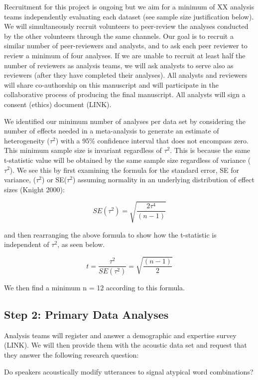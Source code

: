 \documentclass[
  english,
  man]{apa6}
\begin{document}
Recruitment for this project is ongoing but we aim for a minimum of XX analysis teams independently evaluating each dataset (see sample size justification below).
We will simultaneously recruit volunteers to peer-review the analyses conducted by the other volunteers through the same channels.
Our goal is to recruit a similar number of peer-reviewers and analysts, and to ask each peer reviewer to review a minimum of four analyses.
If we are unable to recruit at least half the number of reviewers as analysis teams, we will ask analysts to serve also as reviewers (after they have completed their analyses).
All analysts and reviewers will share co-authorship on this manuscript and will participate in the collaborative process of producing the final manuscript.
All analysts will sign a consent (ethics) document (LINK).

We identified our minimum number of analyses per data set by considering the number of effects needed in a meta-analysis to generate an estimate of heterogeneity (\(\tau^2\)) with a 95\% confidence interval that does not encompass zero.
This minimum sample size is invariant regardless of \(\tau^2\).
This is because the same t-statistic value will be obtained by the same sample size regardless of variance (\(\tau^2\)).
We see this by first examining the formula for the standard error, SE for variance, (\(\tau^2\)) or SE(\(\tau^2\)) assuming normality in an underlying distribution of effect sizes (Knight 2000):

\[SE(\tau^2) = \sqrt{\frac{2\tau^4}{(n-1)}}\]

and then rearranging the above formula to show how the t-statistic is independent of \(\tau^2\), as seen below.

\[t = \frac{\tau^2}{SE(\tau^2)} = \sqrt{\frac{(n-1)}{2}}\]

We then find a minimum n = 12 according to this formula.

\hypertarget{step-2-primary-data-analyses}{%
\subsection{Step 2: Primary Data Analyses}\label{step-2-primary-data-analyses}}

Analysis teams will register and answer a demographic and expertise survey (LINK).
We will then provide them with the acoustic data set and request that they answer the following research question:

Do speakers acoustically modify utterances to signal atypical word combinations?
\end{document}
